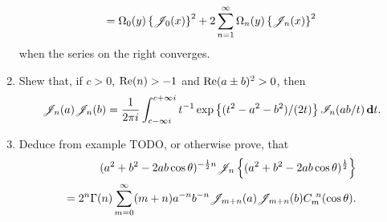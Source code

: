 \documentclass{book}
\begin{document}
\begin{enumerate}
$$  =
  \Omega_{0}(y)
  \left\{ \mathscr{J}_{0}(x) \right\}^{2}
  +
  2 \sum_{n=1}^{\infty} \Omega_{n}(y) \left\{ \mathscr{J}_{n}(x) \right\}^{2}
  $$
  when the series on the right converges.
\item
  Shew that, if $c>0$, $\mathrm{Re}(n) > -1$ and
  $\mathrm{Re}(a \pm b)^{2} > 0$, then
  $$
  \mathscr{J}_{n}(a) \mathscr{J}_{n}(b)
  =
  \frac{1}{2\pi i}
  \int_{c-\infty i}^{c+\infty i}
  t^{-1} \exp \left\{  (t^{2}-a^{2}-b^{2})/(2t) \right\}
  \mathscr{I}_{n}(ab/t) \, \mathbf{d} t.
  $$
\item
  Deduce from example TODO, or otherwise prove, that
  \begin{align*}
    (a^{2}+b^{2}-2ab \cos\theta)^{-\frac{1}{2} n}
    \mathscr{J}_{n}\left\{  (a^{2}+b^{2}-2ab\cos\theta)^{\frac{1}{2}} \right\}
    \\
    =
    2^{n} \Gamma(n)
    \sum_{m=0}^{\infty}
    (m+n) a^{-n} b^{-n} \mathscr{J}_{m+n}(a) \mathscr{J}_{m+n}(b)
    C_{m}^{\ n}(\cos\theta).
  \end{align*}
\end{enumerate}
\end{document}
